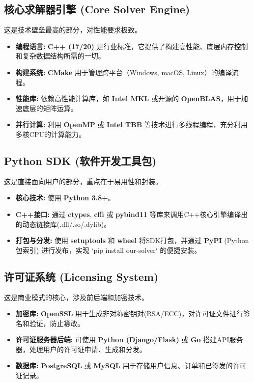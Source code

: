 \documentclass[a4paper, 12pt]{article}
\begin{document}
\subsection{核心求解器引擎 (Core Solver Engine)}
这是技术壁垒最高的部分，对性能要求极致。
\begin{itemize}
    \item \textbf{编程语言:} \textbf{C++ (17/20)} 是行业标准，它提供了构建高性能、底层内存控制和复杂数据结构所需的一切。
    \item \textbf{构建系统:} \textbf{CMake} 用于管理跨平台（Windows, macOS, Linux）的编译流程。
    \item \textbf{性能库:} 依赖高性能计算库，如 \textbf{Intel MKL} 或开源的 \textbf{OpenBLAS}，用于加速底层的矩阵运算。
    \item \textbf{并行计算:} 利用 \textbf{OpenMP} 或 \textbf{Intel TBB} 等技术进行多线程编程，充分利用多核CPU的计算能力。
\end{itemize}

\subsection{Python SDK (软件开发工具包)}
这是直接面向用户的部分，重点在于易用性和封装。
\begin{itemize}
    \item \textbf{核心技术:} 使用 \textbf{Python 3.8+}。
    \item \textbf{C++接口:} 通过 \textbf{ctypes}, \textbf{cffi} 或 \textbf{pybind11} 等库来调用C++核心引擎编译出的动态链接库(.dll/.so/.dylib)。
    \item \textbf{打包与分发:} 使用 \textbf{setuptools} 和 \textbf{wheel} 将SDK打包，并通过 \textbf{PyPI} (Python包索引) 进行发布，实现 `pip install our-solver` 的便捷安装。
\end{itemize}

\subsection{许可证系统 (Licensing System)}
这是商业模式的核心，涉及前后端和加密技术。
\begin{itemize}
    \item \textbf{加密库:} \textbf{OpenSSL} 用于生成非对称密钥对(RSA/ECC)，对许可证文件进行签名和验证，防止篡改。
    \item \textbf{许可证服务器后端:} 可使用 \textbf{Python (Django/Flask)} 或 \textbf{Go} 搭建API服务器，处理用户的许可证申请、生成和分发。
    \item \textbf{数据库:} \textbf{PostgreSQL} 或 \textbf{MySQL} 用于存储用户信息、订单和已签发的许可证记录。
\end{itemize}
\end{document}
